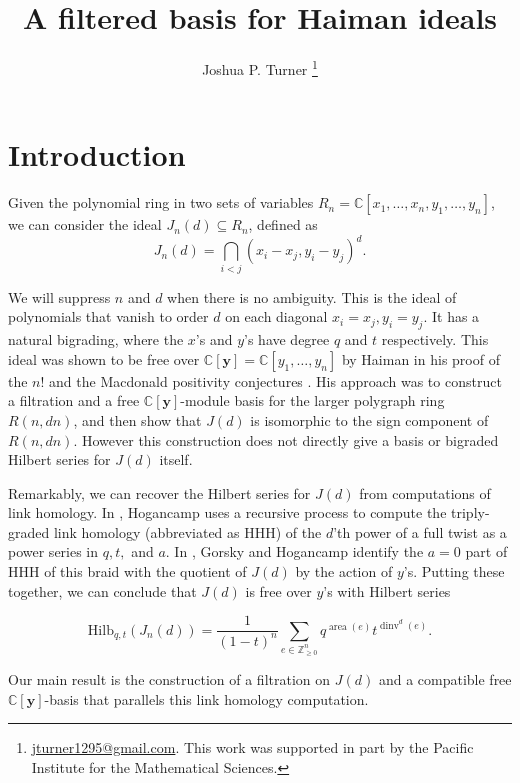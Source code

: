 \documentclass[submission]{FPSAC2027}
\title[A filtered basis for Haiman ideals]{A filtered basis for Haiman ideals}
\author[Joshua P. Turner]{Joshua P. Turner \thanks{\href{mailto:jturner1295@gmail.com}{jturner1295@gmail.com}. This work was supported in part by the Pacific Institute for the Mathematical Sciences.}\addressmark{1}}
\newcommand{\Z}{\mathbb{Z}}
\newcommand{\C}{\mathbb{C}}
\DeclareMathOperator{\area}{area}
\DeclareMathOperator{\dinv}{dinv}
\newcommand{\Y}{\C[\mathbf{y}]}
\newcommand{\Hilb}{\mathrm{Hilb}}
\newcommand{\HHH}{\mathrm{HHH}}
\begin{document}
\maketitle

\section{Introduction}

Given the polynomial ring in two sets of variables $R_n = \C[x_1, \dots, x_n, y_1, \dots, y_n]$, we can consider the ideal $J_n(d) \subseteq R_n$, defined as
$$J_n(d) = \bigcap_{i<j} (x_i-x_j, y_i-y_j)^d.$$

We will suppress $n$ and $d$ when there is no ambiguity. This is the ideal of polynomials that vanish to order $d$ on each diagonal $x_i=x_j, y_i=y_j$. It has a natural bigrading, where the $x$'s and $y$'s have degree $q$ and $t$ respectively. This ideal was shown to be free over $\C[\mathbf{y}] = \C[y_1, \dots, y_n]$ by Haiman in his proof of the $n!$ and the Macdonald positivity conjectures \cite{Haiman}. His approach was to construct a filtration and a free $\C[\mathbf{y}]$-module basis for the larger polygraph ring $R(n,dn)$, and then show that $J(d)$ is isomorphic to the sign component of $R(n,dn)$. However this construction does not directly give a basis or bigraded Hilbert series for $J(d)$ itself.

Remarkably, we can recover the Hilbert series for $J(d)$ from computations of link homology. In \cite{Hog17}, Hogancamp uses a recursive process to compute the triply-graded link homology (abbreviated as $\HHH$) of the $d$'th power of a full twist as a power series in $q,t,$ and $a$. In \cite{GH}, Gorsky and Hogancamp identify the $a=0$ part of $\HHH$ of this braid with the quotient of $J(d)$ by the action of $y$'s. Putting these together, we can conclude that $J(d)$ is free over $y$'s with Hilbert series

\begin{equation}
\label{eqn: hilb series}
\Hilb_{q,t}\left(J_n(d)\right) = \frac{1}{(1-t)^n} \sum_{e \in \Z_{\geq 0}^n} q^{\area(e)}t^{\dinv^d(e)}.
\end{equation}

Our main result is the construction of a filtration on $J(d)$ and a compatible free $\Y$-basis that parallels this link homology computation.
\end{document}
